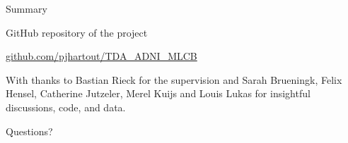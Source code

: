 \documentclass[aspectratio=169, 10pt, dvipsnames]{beamer}
\begin{document}
\begin{frame}{Summary}

  GitHub repository of the project

  \begin{center}\url{github.com/pjhartout/TDA_ADNI_MLCB}\end{center}

  With thanks to Bastian Rieck for the   supervision and Sarah Brueningk, Felix Hensel, Catherine Jutzeler, Merel Kuijs and Louis Lukas for insightful discussions, code, and data.

\end{frame}


\begin{frame}[standout]
  Questions?
\end{frame}



\end{document}
